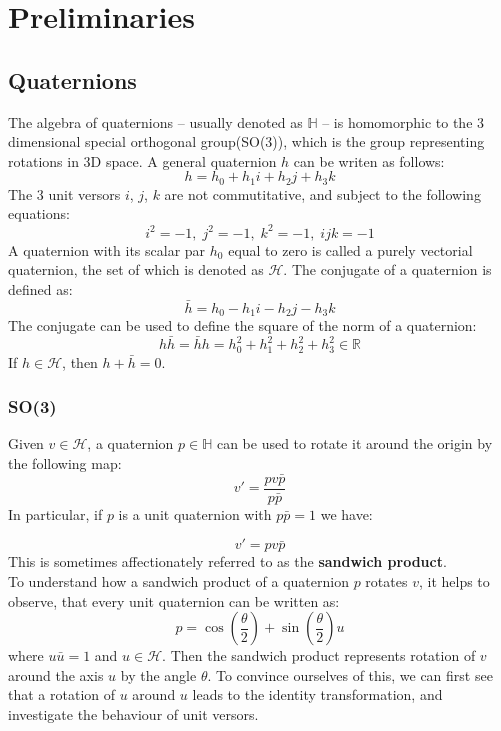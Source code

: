 
\chapter{Preliminaries}
\section{Quaternions}
The algebra of quaternions -- usually denoted as $\mathbb{H}$ -- is homomorphic to the 3 dimensional special orthogonal group(SO(3)), which is the group representing rotations in 3D space. A general quaternion $h$ can be writen as follows:
\begin{equation}
    h = h_0 + h_1i +h_2j + h_3k
\end{equation}
The 3 unit versors $i$,  $j$, $k$ are not commutitative, and subject to the following equations:
\begin{equation}
       i^{2} = -1,\;
       j^{2} = -1,\;
       k^{2} = -1,\;
       ijk = -1
\end{equation}
A quaternion with its scalar par $h_0$ equal to zero is called a purely vectorial quaternion, the set of which is denoted as $\mathcal{H}$.  The conjugate of a quaternion is defined as:
\begin{equation}
    \bar{h} = h_0 - h_1i - h_2j - h_3k
\end{equation}
The conjugate can be used to define the square of the norm of a quaternion:
\begin{equation}
    h\bar{h} = \bar{h}h = h_0^{2} + h_1^{2}+h_2^{2} + h_3^{2} \in \mathbb{R}
\end{equation}
If $h \in \mathcal{H}$, then $h + \bar{h} = 0$.
\subsection{SO(3)}
Given $v \in \mathcal{H}$, a quaternion $p \in \mathbb{H}$ can be used to rotate it around the origin by the following map:
\begin{equation}
    v' = \frac{pv\bar{p}}{p\bar{p}}
\end{equation}
In particular, if $p$ is a unit quaternion with $p\bar{p} = 1$ we have:

\begin{equation}
    v' = pv\bar{p}
\end{equation}
This is sometimes affectionately referred to as the \textbf{sandwich product}.
\\
To understand how a sandwich product of a quaternion $p$ rotates $v$, it helps to observe, that every unit quaternion can be written as:
\begin{equation}
    p = \cos{(\frac{\theta}{2})} + \sin{(\frac{\theta}{2})}u
\end{equation}
where $u\bar{u} = 1$ and  $u\in \mathcal{H}$. Then the sandwich product represents rotation of $v$ around the axis $u$ by the angle $\theta$.
\clearpage
To convince ourselves of this, we can first see that a rotation of $u$ around $u$ leads to the identity transformation, and investigate the behaviour of unit versors.
